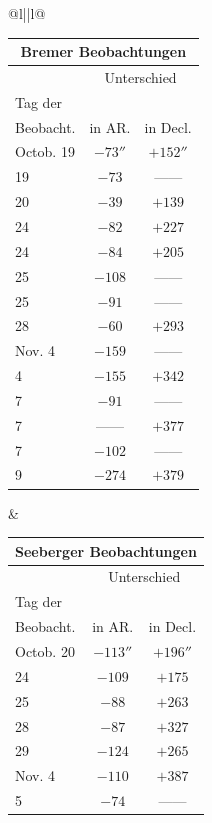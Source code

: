 \begin{center}
\fontsize{9}{11}\selectfont\setlength{\tabcolsep}{5pt}
\renewcommand{\arraystretch}{1.05}\begin{tabular}{@{}l||l@{}}
\begin{tabular}[t]{l|c|c}
\multicolumn{3}{c}{Bremer Beobachtungen}\\\hline
& \multicolumn{2}{c}{Unterschied} \\
Tag der & & \\
Beobacht. & in AR. & in Decl. \\ \hline
Octob. 19 & $-73''$ 
 & $+152''$ \\
19 & $-73$ & ---\;--- \\
20 & $-39$ & $+139$ \\
24 & $-82$ & $+227$ \\
24 & $-84$ & $+205$ \\
25 & $-108$ & ---\;--- \\
25 & $-91$ & ---\;--- \\
28 & $-60$ & $+293$ \\
Nov. 4 & $-159$ & ---\;--- \\
4 & $-155$ & $+342$ \\
7 & $-91$ & ---\;--- \\
7 & ---\;--- & $+377$ \\
7 & $-102$ & ---\;--- \\
9 & $-274$ & $+379$ \\
\end{tabular} &
\begin{tabular}[t]{l|c|c}
\multicolumn{3}{c}{Seeberger Beobachtungen}\\\hline
& \multicolumn{2}{c}{Unterschied} \\
Tag der & & \\
Beobacht. & in AR. & in Decl. \\ \hline
Octob. 20 & $-113''$ & $+196''$ \\
24 & $-109$ & $+175$ \\
25 & $-88$ & $+263$ \\
28 & $-87$ & $+327$ \\
29 & $-124$ & $+265$ \\
Nov. 4 & $-110$ & $+387$ \\
5 & $-74$ & ---\;--- \\
\end{tabular}\\
\end{tabular}
\end{center}


